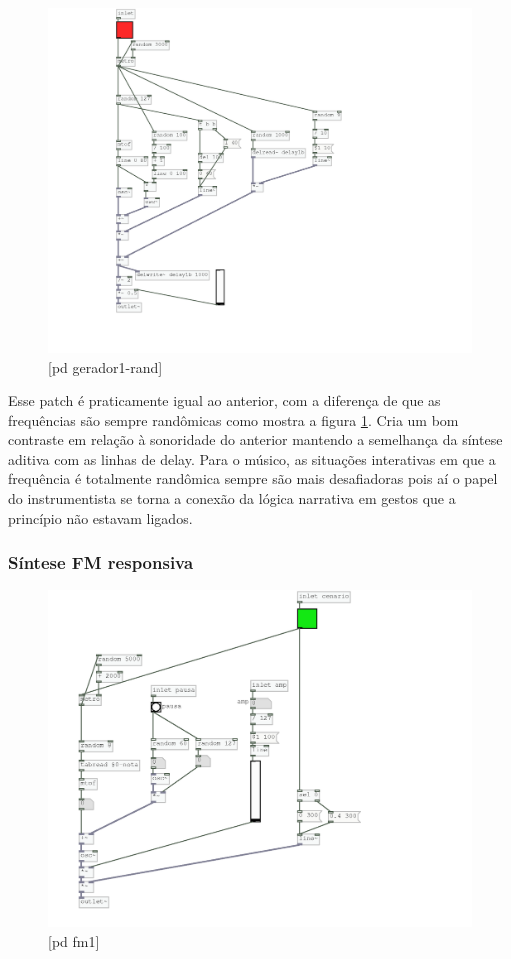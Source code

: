 \documentclass{ppgmus}
\begin{document}
\begin{figure}
\includegraphics[scale=.6]{gerador-sintese1-rand}
\caption{[pd gerador1-rand]}
\label{gerador1rand}
\end{figure}

Esse patch é praticamente igual ao anterior, com a diferença de que as frequências
são sempre randômicas como mostra a figura \ref{gerador1rand}. Cria um bom contraste 
em relação à sonoridade do anterior mantendo a semelhança da síntese aditiva com as linhas de delay. 
Para o músico, as situações interativas em que a frequência é totalmente randômica sempre são mais
desafiadoras pois aí o papel do instrumentista se torna a conexão da lógica narrativa em gestos que a
princípio não estavam ligados.


\subsubsection{Síntese FM responsiva}

\begin{figure}
\includegraphics[scale=.6]{gerador-sintese-fm}
\caption{[pd fm1]}
\label{geradorfm}
\end{figure}
\end{document}

